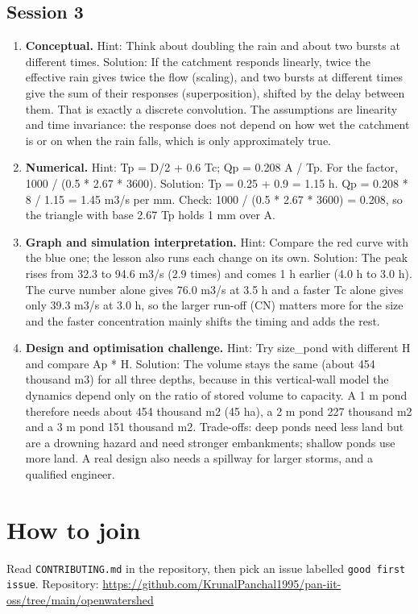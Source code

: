 \documentclass[11pt,a4paper]{article}
\begin{document}
\subsection*{Session 3}
\begin{enumerate}[nosep]
\item \textbf{Conceptual.} Hint: Think about doubling the rain and about two bursts at different times. Solution: If the catchment responds linearly, twice the effective rain gives twice the flow (scaling), and two bursts at different times give the sum of their responses (superposition), shifted by the delay between them. That is exactly a discrete convolution. The assumptions are linearity and time invariance: the response does not depend on how wet the catchment is or on when the rain falls, which is only approximately true.
\item \textbf{Numerical.} Hint: Tp = D/2 + 0.6 Tc; Qp = 0.208 A / Tp. For the factor, 1000 / (0.5 * 2.67 * 3600). Solution: Tp = 0.25 + 0.9 = 1.15 h. Qp = 0.208 * 8 / 1.15 = 1.45 m3/s per mm. Check: 1000 / (0.5 * 2.67 * 3600) = 0.208, so the triangle with base 2.67 Tp holds 1 mm over A.
\item \textbf{Graph and simulation interpretation.} Hint: Compare the red curve with the blue one; the lesson also runs each change on its own. Solution: The peak rises from 32.3 to 94.6 m3/s (2.9 times) and comes 1 h earlier (4.0 h to 3.0 h). The curve number alone gives 76.0 m3/s at 3.5 h and a faster Tc alone gives only 39.3 m3/s at 3.0 h, so the larger run-off (CN) matters more for the size and the faster concentration mainly shifts the timing and adds the rest.
\item \textbf{Design and optimisation challenge.} Hint: Try size\_pond with different H and compare Ap * H. Solution: The volume stays the same (about 454 thousand m3) for all three depths, because in this vertical-wall model the dynamics depend only on the ratio of stored volume to capacity. A 1 m pond therefore needs about 454 thousand m2 (45 ha), a 2 m pond 227 thousand m2 and a 3 m pond 151 thousand m2. Trade-offs: deep ponds need less land but are a drowning hazard and need stronger embankments; shallow ponds use more land. A real design also needs a spillway for larger storms, and a qualified engineer.
\end{enumerate}

\section{How to join}
Read \texttt{CONTRIBUTING.md} in the repository, then pick an issue labelled \texttt{good first issue}. Repository: \url{https://github.com/KrunalPanchal1995/pan-iit-oss/tree/main/openwatershed}
\end{document}
